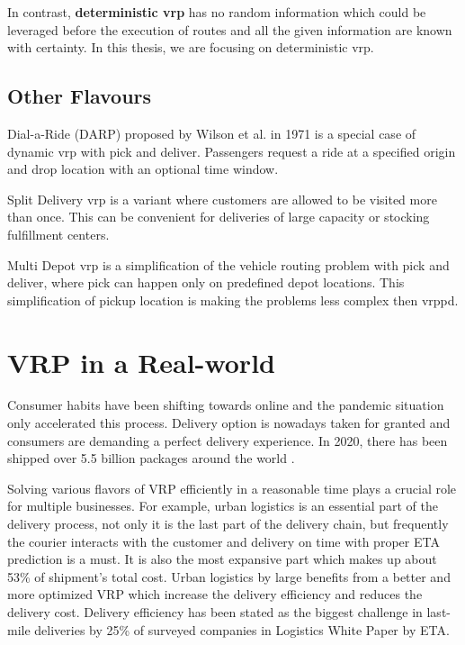     In contrast, \textbf{deterministic \gls{vrp}} has no random information which could be leveraged before the execution of routes and all the given information are known with certainty. In this thesis, we are focusing on deterministic \gls{vrp}.
    
    \subsection{Other Flavours}
    Dial-a-Ride (DARP) proposed by Wilson et al. \cite{darp-proposed} in 1971 is a special case of dynamic \gls{vrp} with pick and deliver. Passengers request a ride at a specified origin and drop location with an optional time window. 
    
    Split Delivery \gls{vrp} \cite{split-deliver} is a variant where customers are allowed to be visited more than once. This can be convenient for deliveries of large capacity or stocking fulfillment centers.
    
    Multi Depot \gls{vrp} is a simplification of the vehicle routing problem with pick and deliver, where pick can happen only on predefined depot locations. This simplification of pickup location is making the problems less complex then \gls{vrppd}.
    
\section{VRP in a Real-world}
Consumer habits have been shifting towards online and the pandemic situation only accelerated this process. Delivery option is nowadays taken for granted and consumers are demanding a perfect delivery experience. In 2020, there has been shipped over 5.5 billion packages around the world \cite{num-shipped-packages}.

Solving various flavors of \gls{VRP} efficiently in a reasonable time plays a crucial role for multiple businesses. For example, urban logistics is an essential part of the delivery process, not only it is the last part of the delivery chain, but frequently the courier interacts with the customer and delivery on time with proper ETA prediction is a must. It is also the most expansive part which makes up about 53\% of shipment’s total cost\cite{last-mile-cost}. Urban logistics by large benefits from a better and more optimized \gls{VRP} which increase the delivery efficiency and reduces the delivery cost. Delivery efficiency has been stated as the biggest challenge in last-mile deliveries by 25\% of surveyed companies in Logistics White Paper by ETA\cite{logistics-whitepaper}.

